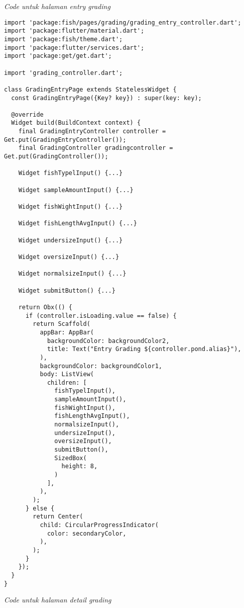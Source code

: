 	\textit{Code untuk halaman entry grading}
	\begin{lstlisting}
import 'package:fish/pages/grading/grading_entry_controller.dart';
import 'package:flutter/material.dart';
import 'package:fish/theme.dart';
import 'package:flutter/services.dart';
import 'package:get/get.dart';

import 'grading_controller.dart';

class GradingEntryPage extends StatelessWidget {
  const GradingEntryPage({Key? key}) : super(key: key);

  @override
  Widget build(BuildContext context) {
    final GradingEntryController controller = Get.put(GradingEntryController());
    final GradingController gradingcontroller = Get.put(GradingController());

    Widget fishTypelInput() {...}

    Widget sampleAmountInput() {...}

    Widget fishWightInput() {...}

    Widget fishLengthAvgInput() {...}

    Widget undersizeInput() {...}

    Widget oversizeInput() {...}

    Widget normalsizeInput() {...}

    Widget submitButton() {...}

    return Obx(() {
      if (controller.isLoading.value == false) {
        return Scaffold(
          appBar: AppBar(
            backgroundColor: backgroundColor2,
            title: Text("Entry Grading ${controller.pond.alias}"),
          ),
          backgroundColor: backgroundColor1,
          body: ListView(
            children: [
              fishTypelInput(),
              sampleAmountInput(),
              fishWightInput(),
              fishLengthAvgInput(),
              normalsizeInput(),
              undersizeInput(),
              oversizeInput(),
              submitButton(),
              SizedBox(
                height: 8,
              )
            ],
          ),
        );
      } else {
        return Center(
          child: CircularProgressIndicator(
            color: secondaryColor,
          ),
        );
      }
    });
  }
}

	\end{lstlisting}
	\textit{Code untuk halaman detail grading}
